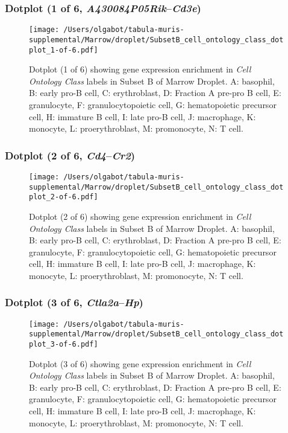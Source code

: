 \clearpage

\subsubsection{Dotplot (1 of 6, \emph{A430084P05Rik}--\emph{Cd3e})}
\begin{figure}[h]
\centering
\texttt{[image: /Users/olgabot/tabula-muris-supplemental/Marrow/droplet/SubsetB\_cell\_ontology\_class\_dotplot\_1-of-6.pdf]}

\caption{ Dotplot (1 of 6)  showing gene expression enrichment in \emph{Cell Ontology Class} labels in Subset B of Marrow Droplet. A: basophil, B: early pro-B cell, C: erythroblast, D: Fraction A pre-pro B cell, E: granulocyte, F: granulocytopoietic cell, G: hematopoietic precursor cell, H: immature B cell, I: late pro-B cell, J: macrophage, K: monocyte, L: proerythroblast, M: promonocyte, N: T cell.}
\end{figure}


\clearpage

\subsubsection{Dotplot (2 of 6, \emph{Cd4}--\emph{Cr2})}
\begin{figure}[h]
\centering
\texttt{[image: /Users/olgabot/tabula-muris-supplemental/Marrow/droplet/SubsetB\_cell\_ontology\_class\_dotplot\_2-of-6.pdf]}

\caption{ Dotplot (2 of 6)  showing gene expression enrichment in \emph{Cell Ontology Class} labels in Subset B of Marrow Droplet. A: basophil, B: early pro-B cell, C: erythroblast, D: Fraction A pre-pro B cell, E: granulocyte, F: granulocytopoietic cell, G: hematopoietic precursor cell, H: immature B cell, I: late pro-B cell, J: macrophage, K: monocyte, L: proerythroblast, M: promonocyte, N: T cell.}
\end{figure}


\clearpage

\subsubsection{Dotplot (3 of 6, \emph{Ctla2a}--\emph{Hp})}
\begin{figure}[h]
\centering
\texttt{[image: /Users/olgabot/tabula-muris-supplemental/Marrow/droplet/SubsetB\_cell\_ontology\_class\_dotplot\_3-of-6.pdf]}

\caption{ Dotplot (3 of 6)  showing gene expression enrichment in \emph{Cell Ontology Class} labels in Subset B of Marrow Droplet. A: basophil, B: early pro-B cell, C: erythroblast, D: Fraction A pre-pro B cell, E: granulocyte, F: granulocytopoietic cell, G: hematopoietic precursor cell, H: immature B cell, I: late pro-B cell, J: macrophage, K: monocyte, L: proerythroblast, M: promonocyte, N: T cell.}
\end{figure}


